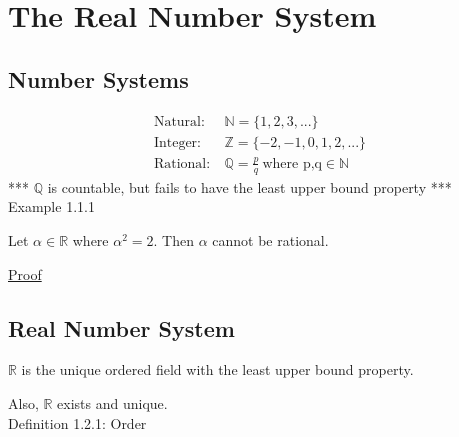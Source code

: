 \newpage
\section[Day 1: The Real Number System]{The Real Number System}





\subsection{Number Systems}

\begin{align*}
	\text{Natural}:\ & \mathbb{N} = \{1, 2, 3, ... \} \\	
	\text{Integer}:\ & \mathbb{Z} = \{-2, -1, 0, 1, 2, ... \} \\
	\text{Rational}:\ & \mathbb{Q} = \frac{p}{q} \ \text{where p,q} \in \mathbb{N}
\end{align*}
*** $\mathbb{Q}$ is countable, but fails to have the least upper bound property *** \\

{ \color{purple} Example 1.1.1 }

	\hspace{1cm}
	Let $ \alpha \in \mathbb{R} $ where $ \alpha^2 = 2 $.
	Then $ \alpha $ cannot be rational.

{ \color{magenta} \underline{Proof} }






\subsection{Real Number System}

	$ \mathbb{R} $ is the unique ordered field with the least upper bound property.
	
	Also, $ \mathbb{R} $ exists and unique. \\

{ \color{blue} Definition 1.2.1: Order }

